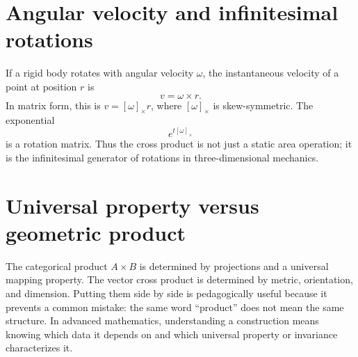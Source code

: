 \section{Angular velocity and infinitesimal rotations}

If a rigid body rotates with angular velocity $\omega$, the instantaneous velocity of a point at position $r$ is
\[
  v=\omega\times r.
\]
In matrix form, this is $v=[\omega]_\times r$, where $[\omega]_\times$ is skew-symmetric.  The exponential
\[
  e^{t[\omega]_\times}
\]
is a rotation matrix.  Thus the cross product is not just a static area operation; it is the infinitesimal generator of rotations in three-dimensional mechanics.

\section{Universal property versus geometric product}

The categorical product $A\times B$ is determined by projections and a universal mapping property.  The vector cross product is determined by metric, orientation, and dimension.  Putting them side by side is pedagogically useful because it prevents a common mistake: the same word ``product'' does not mean the same structure.  In advanced mathematics, understanding a construction means knowing which data it depends on and which universal property or invariance characterizes it.
